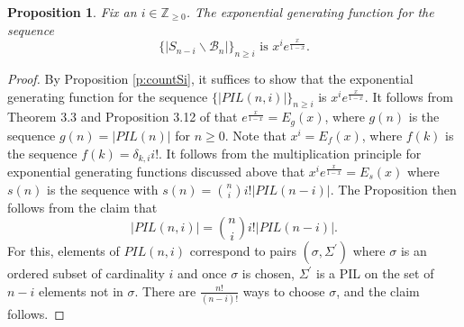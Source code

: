 \documentclass[12pt]{amsart}
\numberwithin{equation}{section}
\newtheorem{prop}[thm]{Proposition}
\theoremstyle{remark}
\newtheorem{rem}[thm]{Remark}
\theoremstyle{definition}
\newcommand{\B}{\mathcal{B}}
\begin{document}
\begin{prop}\label{p:egfforSi}
Fix an $i\in\mathbb{Z}_{\geq 0}$.  
The exponential generating function for the sequence 
\begin{equation}\label{eq:egfforSi}
\{|S_{n-i}\backslash \B_{n}|\}_{n\geq i} \mbox{ is } x^{i}e^{\frac{x}{1-x}}.
\end{equation}
\end{prop}
\begin{proof}
By Proposition \ref{p:countSi}, it suffices to show that the exponential generating function for the sequence 
$\{|PIL(n,i)|\}_{n\geq i}$ is $x^{i}e^{\frac{x}{1-x}}$.  
It follows from Theorem 3.3 and Proposition 3.12 of \cite{CE21II} that $e^{\frac{x}{1-x}}=E_{g}(x)$, where $g(n)$ is the sequence $g(n)=|PIL(n)|$ for $n\geq 0$.  Note that $x^{i}=E_{f}(x)$, where $f(k)$ is the sequence 
$f(k)=\delta_{k, i} i !$.  It follows from the multiplication principle for exponential generating functions discussed above that $x^{i}e^{\frac{x}{1-x}}=E_{s}(x)$ where $s(n)$ is the sequence with 
$s(n)={n\choose i} i! |PIL(n-i)|$.  The Proposition then follows from the claim that 
\begin{equation}\label{eq:countformula}
|PIL(n,i)|={n\choose i} i! |PIL(n-i)|.
\end{equation}
For this, elements of $PIL(n,i)$ correspond to pairs $(\sigma, \Sigma^{\prime})$ where $\sigma$ is an ordered subset of cardinality $i$ and once $\sigma$ is chosen,  $\Sigma^{\prime}$ is a PIL on the set of $n-i$ elements not in $\sigma$.    There are $\frac{n!}{(n-i)!}$ ways to choose $\sigma$, and the claim follows.
\end{proof}

\end{document}
